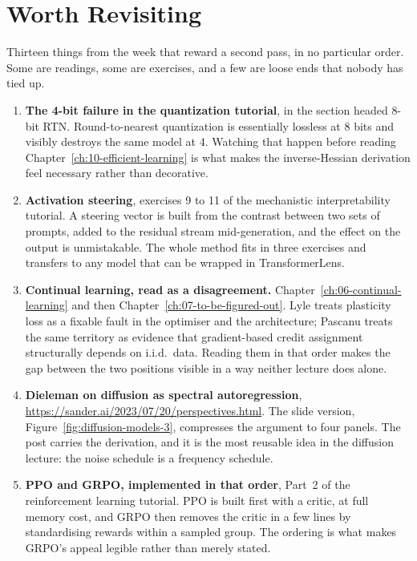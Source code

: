 \chapter{Worth Revisiting}
\label{ch:revisit}

Thirteen things from the week that reward a second pass, in no particular order. Some are readings,
some are exercises, and a few are loose ends that nobody has tied up.

\begin{enumerate}

\item \textbf{The 4-bit failure in the quantization tutorial}, in the section headed 8-bit RTN.
  Round-to-nearest quantization is essentially lossless at 8 bits and visibly destroys the same model
  at 4. Watching that happen before reading Chapter~\ref{ch:10-efficient-learning} is what makes the
  inverse-Hessian derivation feel necessary rather than decorative.

\item \textbf{Activation steering}, exercises 9 to 11 of the mechanistic interpretability tutorial.
  A steering vector is built from the contrast between two sets of prompts, added to the residual
  stream mid-generation, and the effect on the output is unmistakable. The whole method fits in three
  exercises and transfers to any model that can be wrapped in TransformerLens.

\item \textbf{Continual learning, read as a disagreement.} Chapter~\ref{ch:06-continual-learning}
  and then Chapter~\ref{ch:07-to-be-figured-out}. Lyle treats plasticity loss as a fixable fault in
  the optimiser and the architecture; Pascanu treats the same territory as evidence that
  gradient-based credit assignment structurally depends on i.i.d.\ data. Reading them in that order
  makes the gap between the two positions visible in a way neither lecture does alone.

\item \textbf{Dieleman on diffusion as spectral autoregression},
  \url{https://sander.ai/2023/07/20/perspectives.html}. The slide version, Figure~\ref{fig:diffusion-models-3}, compresses
  the argument to four panels. The post carries the derivation, and it is the most reusable idea in
  the diffusion lecture: the noise schedule is a frequency schedule.

\item \textbf{PPO and GRPO, implemented in that order}, Part~2 of the reinforcement learning
  tutorial. PPO is built first with a critic, at full memory cost, and GRPO then removes the critic
  in a few lines by standardising rewards within a sampled group. The ordering is what makes GRPO's
  appeal legible rather than merely stated.


\end{enumerate}
